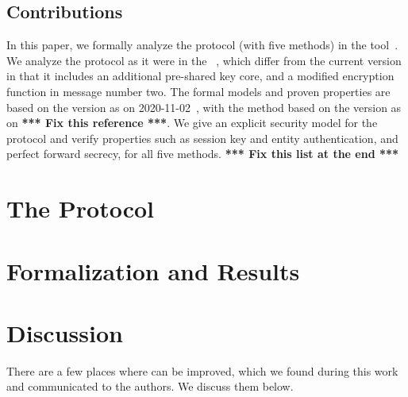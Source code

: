 \documentclass[runningheads, envcountsame, hidelinks, a4paper, draft, x11names]{llncs}
\begin{document}
\subsection{Contributions}
\label{sec:contributions}
In this paper, we formally analyze the \mEdhoc{} protocol (with five methods)
in the \mTamarin{} tool~\cite{DBLP:conf/cav/MeierSCB13}.
%
We analyze the protocol as it were in the
\mSpec{}~\cite{our-analysis-selander-lake-edhoc-01}, which differ from the
current version in that it includes an additional pre-shared key core, and a
modified encryption function in message number two.
%
%
The formal models and proven properties are based on the version as on
2020-11-02~\cite{our-analysis-selander-lake-edhoc-01}, with the \mPskPsk{} method based on the version as on \textbf{*** Fix this reference ***}.
%
We give an explicit security model for the protocol and verify
properties such as session key and entity authentication, and perfect forward
secrecy, for all five methods. \textbf{*** Fix this list at the end ***}
%
%
%

\section{The \mEdhoc{} Protocol}
\label{sec:edhoc}


\section{Formalization and Results}
\label{sec:formalization}


\section{Discussion}
\label{sec:discussion}
There are a few places where \mEdhoc{} can be improved,
which we found during this work and communicated to the authors.
%
We discuss them below.
%
\end{document}
